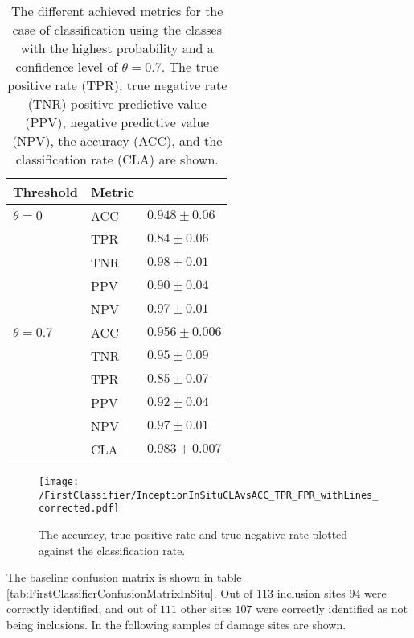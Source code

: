 
\begin{table}[H]
 \begin{center}
  \begin{tabular}{@{} *3l @{}} \toprule[2pt]
   Threshold & Metric &   \\ \midrule
   $\theta=0$ & ACC & $0.948\pm0.06$ \\
   &TPR  & $0.84\pm 0.06$ \\
   &TNR  & $0.98\pm 0.01$ \\
   &PPV  & $0.90\pm0.04$ \\
   &NPV  & $0.97\pm0.01$ \\ \midrule
   $\theta=0.7$& ACC & $0.956 \pm 0.006$ \\
   &TNR  & $0.95\pm 0.09$ \\
   &TPR  & $0.85\pm 0.07$ \\
   &PPV  & $0.92\pm 0.04$ \\
   &NPV  & $0.97 \pm0.01$ \\ 
   &CLA  & $0.983\pm 0.007$ \\ \bottomrule[2pt]
  \end{tabular}
 \end{center}
 \caption{{The different achieved metrics for the case of classification using the classes with the highest probability and a confidence level of $\theta =0.7$. The true positive rate (TPR), true negative rate (TNR) positive predictive value (PPV), negative predictive value (NPV), the accuracy (ACC), and the classification rate (CLA) are shown.}}
   \label{tab:FirstClassifierMetrics}
\end{table}

\begin{figure}[H]
\texttt{[image: /FirstClassifier/InceptionInSituCLAvsACC\_TPR\_FPR\_withLines\_corrected.pdf]}
\caption{The accuracy, true positive rate and true negative rate plotted against the classification rate. }
\label{fig:FirstClassifierInSitu}
\end{figure}

The baseline confusion matrix is shown in table \ref{tab:FirstClassifierConfusionMatrixInSitu}. Out of $113$ inclusion sites $94$ were correctly identified, and out of $111$ other sites $107$ were correctly identified as not being inclusions. In the following samples of damage sites are shown.

